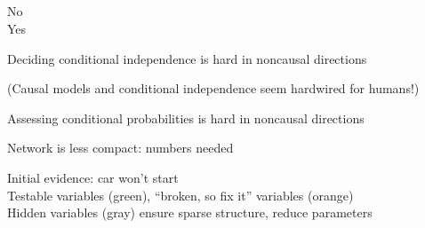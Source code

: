 \documentclass{article}
\begin{document}
\begin{huge}


\vspace*{0.1in}

\textwidth
{}

\vspace*{-0.65in}

\\
\\
\\
\\
\quad No\\
\quad Yes



\vspace*{0.15in}

\textwidth
{}

\vspace*{-0.15in}

Deciding conditional independence is hard in noncausal directions

(Causal models and conditional independence seem hardwired for humans!)

Assessing conditional probabilities is hard in noncausal directions

Network is less compact:  numbers needed




Initial evidence: car won't start\\
Testable variables (green), ``broken, so fix it'' variables (orange)\\
Hidden variables (gray) ensure sparse structure, reduce parameters


\end{huge}
\end{document}
